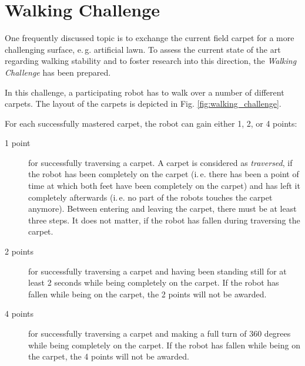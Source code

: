 \documentclass[12pt]{article}
\newcommand{\ie}{\mbox{i.\,e.}\xspace}
\newcommand{\eg}{\mbox{e.\,g.}\xspace}
\begin{document}
\newpage






\section{Walking Challenge}

One frequently discussed topic is to exchange the current field carpet for a more challenging surface, \eg artificial lawn.
To assess the current state of the art regarding walking stability and to foster research into this direction, the \textit{Walking Challenge} has been prepared.

In this challenge, a participating robot has to walk over a number of different carpets. The layout of the carpets is depicted in Fig. \ref{fig:walking_challenge}.

For each successfully mastered carpet, the robot can gain either 1, 2, or 4 points: 

\begin{description}
\item[1 point] for successfully traversing a carpet. A carpet is considered as \textit{traversed}, if the robot has been completely on the carpet (\ie there has been a point of time at which both feet have been completely on the carpet) and has left it completely afterwards (\ie no part of the robots touches the carpet anymore). Between entering and leaving the carpet, there must be at least three steps. It does not matter, if the robot has fallen during traversing the carpet.
\item[2 points] for successfully traversing a carpet and having been standing still for at least 2 seconds while being completely on the carpet. If the robot has fallen while being on the carpet, the 2 points will not be awarded.
\item[4 points] for successfully traversing a carpet and making a full turn of 360 degrees while being completely on the carpet. If the robot has fallen while being on the carpet, the 4 points will not be awarded.
\end{description}
\end{document}

